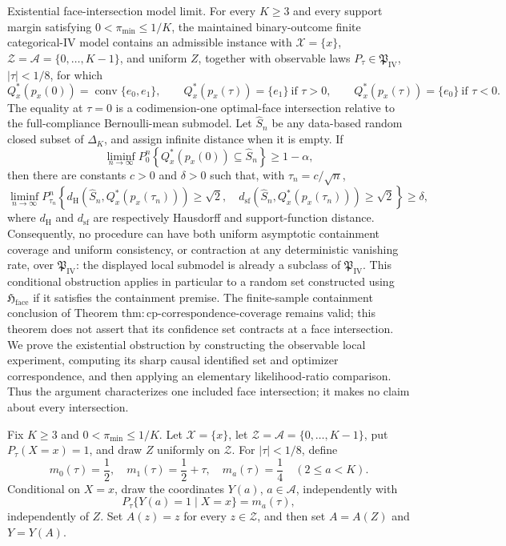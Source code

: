 Existential face-intersection model limit.  For every \(K\geq3\) and every support margin satisfying \(0<\pi_{\min}\leq 1/K\), the maintained binary-outcome finite categorical-IV model contains an admissible instance with \(\mathcal X=\{x\}\), \(\mathcal Z=\mathcal A=\{0,\ldots,K-1\}\), and uniform \(Z\), together with observable laws \(P_\tau\in\mathfrak P_{\mathrm{IV}}\), \(|\tau|<1/8\), for which
\[
 Q_x^*(p_x(0))=\operatorname{conv}\{e_0,e_1\},\qquad
 Q_x^*(p_x(\tau))=\{e_1\}\ \text{if }\tau>0,
 \qquad
 Q_x^*(p_x(\tau))=\{e_0\}\ \text{if }\tau<0.
\]
The equality at \(\tau=0\) is a codimension-one optimal-face intersection relative to the full-compliance Bernoulli-mean submodel.  Let \(\widehat S_n\) be any data-based random closed subset of \(\Delta_K\), and assign infinite distance when it is empty.  If
\[
 \liminf_{n\to\infty}P_0^n\!\left\{Q_x^*(p_x(0))\subseteq\widehat S_n\right\}\geq1-\alpha,
\]
then there are constants \(c>0\) and \(\delta>0\) such that, with \(\tau_n=c/\sqrt n\),
\[
 \liminf_{n\to\infty}P_{\tau_n}^n\!\left\{
 d_{\mathrm H}\!\left(\widehat S_n,Q_x^*(p_x(\tau_n))\right)\geq\sqrt2,
 \quad
 d_{\mathrm{sf}}\!\left(\widehat S_n,Q_x^*(p_x(\tau_n))\right)\geq\sqrt2
 \right\}\geq\delta,
\]
where \(d_{\mathrm H}\) and \(d_{\mathrm{sf}}\) are respectively Hausdorff and support-function distance.  Consequently, no procedure can have both uniform asymptotic containment coverage and uniform consistency, or contraction at any deterministic vanishing rate, over \(\mathfrak P_{\mathrm{IV}}\): the displayed local submodel is already a subclass of \(\mathfrak P_{\mathrm{IV}}\).  This conditional obstruction applies in particular to a random set constructed using \(\mathfrak H_{\mathrm{face}}\) if it satisfies the containment premise.  The finite-sample containment conclusion of Theorem \(\mathrm{thm{:}cp\text{-}correspondence\text{-}coverage}\) remains valid; this theorem does not assert that its confidence set contracts at a face intersection.
We prove the existential obstruction by constructing the observable local experiment, computing its sharp causal identified set and optimizer correspondence, and then applying an elementary likelihood-ratio comparison.  Thus the argument characterizes one included face intersection; it makes no claim about every intersection.

Fix \(K\geq3\) and \(0<\pi_{\min}\leq1/K\).  Let \(\mathcal X=\{x\}\), let \(\mathcal Z=\mathcal A=\{0,\ldots,K-1\}\), put \(P_\tau(X=x)=1\), and draw \(Z\) uniformly on \(\mathcal Z\).  For \(|\tau|<1/8\), define
\[
 m_0(\tau)=\frac12,\quad
 m_1(\tau)=\frac12+\tau,\quad
 m_a(\tau)=\frac14\quad(2\leq a<K).
\]
Conditional on \(X=x\), draw the coordinates \(Y(a)\), \(a\in\mathcal A\), independently with
\[
 P_\tau\{Y(a)=1\mid X=x\}=m_a(\tau),
\]
independently of \(Z\).  Set \(A(z)=z\) for every \(z\in\mathcal Z\), and then set \(A=A(Z)\) and \(Y=Y(A)\).

